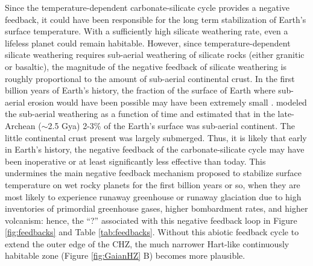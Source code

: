 Since the temperature-dependent carbonate-silicate cycle provides a negative feedback, it could have been responsible for the long term stabilization of Earth's surface temperature. With a sufficiently high silicate weathering rate, even a lifeless planet could remain habitable. However, since temperature-dependent silicate weathering requires sub-aerial weathering of silicate rocks (either granitic or basaltic), the magnitude of the negative feedback of silicate weathering is roughly proportional to the amount of sub-aerial continental crust. In the first billion years of Earth's history, the fraction of the surface of Earth where sub-aerial erosion would have been possible may have been extremely small \citep{Flament2008,Abbot2012,Dhuime2015}. \citet{Flament2008} modeled the sub-aerial weathering as a function of time and estimated that in the late-Archean ($\sim$2.5 Gya)  2-3\%  of the Earth's surface was sub-aerial continent. The little continental crust present was largely submerged. Thus, it is likely that early in Earth's history, the negative feedback of the carbonate-silicate cycle may have been inoperative or at least significantly less effective than today. This undermines the main negative feedback mechanism proposed to stabilize surface temperature on wet rocky planets for the first billion years or so, when they are most likely to experience runaway greenhouse or runaway glaciation due to high inventories of primordial greenhouse gases, higher bombardment rates, and higher volcanism: hence, the ``?'' associated with this negative feedback loop in Figure \ref{fig:feedbacks} and Table \ref{tab:feedbacks}. Without this abiotic feedback cycle to extend the outer edge of the CHZ, the much narrower Hart-like continuously habitable zone (Figure \ref{fig:GaianHZ} B) becomes more plausible.

